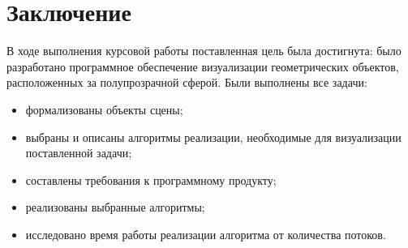 \section*{Заключение}
{}

В ходе выполнения курсовой работы поставленная цель была достигнута: было разработано программное обеспечение визуализации геометрических объектов, расположенных за полупрозрачной сферой. 
Были выполнены все задачи:
\begin{itemize}
	\item формализованы объекты сцены;
	\item выбраны и описаны алгоритмы реализации, необходимые для визуализации поставленной задачи;
	\item составлены требования к программному продукту;
	\item реализованы выбранные алгоритмы;
	\item исследовано время работы реализации алгоритма от количества потоков.
\end{itemize}

\newpage